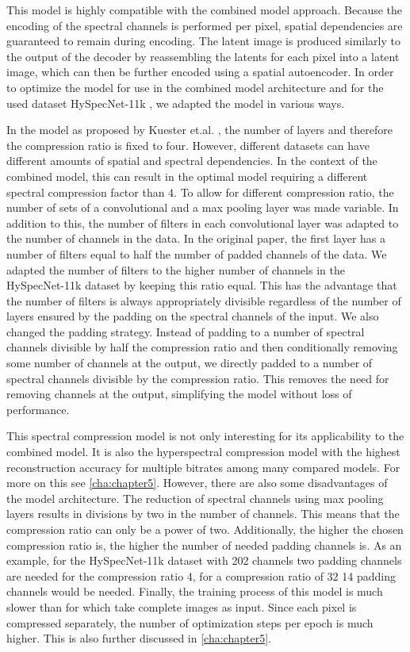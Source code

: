 This model is highly compatible with the combined model approach. Because the encoding of the spectral channels is performed per pixel, spatial dependencies are guaranteed to remain during encoding. The latent image is produced similarly to the output of the decoder by reassembling the latents for each pixel into a latent image, which can then be further encoded using a spatial autoencoder. In order to optimize the model for use in the combined model architecture and for the used dataset HySpecNet-11k \citep{fuchs_hyspecnet-11k_2023}, we adapted the model in various ways.

In the model as proposed by Kuester et.al. \citep{kuester_1d-convolutional_2021,kuester_transferability_2022}, the number of layers and therefore the compression ratio is fixed to four. However, different datasets can have different amounts of spatial and spectral dependencies. In the context of the combined model, this can result in the optimal model requiring a different spectral compression factor than 4. To allow for different compression ratio, the number of sets of a convolutional and a max pooling layer was made variable. In addition to this, the number of filters in each convolutional layer was adapted to the number of channels in the data. In the original paper, the first layer has a number of filters equal to half the number of padded channels of the data. We adapted the number of filters to the higher number of channels in the HySpecNet-11k dataset by keeping this ratio equal. This has the advantage that the number of filters is always appropriately divisible regardless of the number of layers ensured by the padding on the spectral channels of the input. We also changed the padding strategy. Instead of padding to a number of spectral channels divisible by half the compression ratio and then conditionally removing some number of channels at the output, we directly padded to a number of spectral channels divisible by the compression ratio. This removes the need for removing channels at the output, simplifying the model without loss of performance.

This spectral compression model is not only interesting for its applicability to the combined model. It is also the hyperspectral compression model with the highest reconstruction accuracy for multiple bitrates among many compared models. For more on this see \autoref{cha:chapter5}. However, there are also some disadvantages of the model architecture. The reduction of spectral channels using max pooling layers results in divisions by two in the number of channels. This means that the compression ratio can only be a power of two. Additionally, the higher the chosen compression ratio is, the higher the number of needed padding channels is. As an example, for the HySpecNet-11k dataset with 202 channels two padding channels are needed for the compression ratio 4, for a compression ratio of 32 14 padding channels would be needed. Finally, the training process of this model is much slower than for which take complete images as input. Since each pixel is compressed separately, the number of optimization steps per epoch is much higher. This is also further discussed in \autoref{cha:chapter5}.
